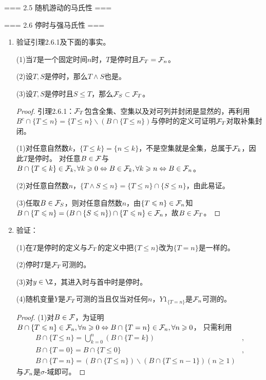 === 2.5 随机游动的马氏性 ===

=== 2.6 停时与强马氏性 ===
\begin{enumerate}
    \item[2.6.1] 验证引理2.6.1及下面的事实。

    (1)当$T$是一个固定时间$n$时，$T$是停时且$\mathcal{F}_T=\mathcal{F}_n$。

    (2)设$T,S$是停时，那么$T\land S$也是。

    (3)设$T,S$是停时且$S\leqslant T$，那么$\mathcal{F}_S\subset\mathcal{F}_T$。
    \begin{proof}
        引理2.6.1：$\mathcal{F}_T$包含全集、空集以及对可列并封闭是显然的，再利用
        $B^c\cap\{T\leqslant n\}=\{T\leqslant n\}\backslash(B\cap\{T\leqslant n\})$与停时的定义可证明$\mathcal{F}_T$对取补集封闭。

        (1)对任意自然数$k$，$\{T\leqslant k\}=\{n\leqslant k\}$，不是空集就是全集，总属于$\mathcal{F}_k$，因此$T$是停时。
        对任意$B\in\mathcal{F}$与$B\cap\{T\leqslant k\}\in\mathcal{F}_k,\forall k\geqslant0\Leftrightarrow B\in\mathcal{F}_k,\forall k\geqslant n\Leftrightarrow B\in\mathcal{F}_n$。

        (2)对任意自然数$n$，$\{T\land S\leqslant n\}=\{T\leqslant n\}\cap\{S\leqslant n\}$，由此易证。

        (3)任取$B\in\mathcal{F}_S$，则对任意自然数$n$，由$\{T\leqslant n\}\in\mathcal{F}_n$知
        $B\cap\{T\leqslant n\}=(B\cap\{S\leqslant n\})\cap\{T\leqslant n\}\in\mathcal{F}_n$，故$B\in\mathcal{F}_T$。
    \end{proof}
    \item[2.6.2] 验证：

    (1)在$T$是停时的定义与$\mathcal{F}_T$的定义中把$\{T\leqslant n\}$改为$\{T=n\}$是一样的。

    (2)停时$T$是$\mathcal{F}_T$可测的。

    (3)对$y\in\Z$，其进入时与首中时是停时。

    (4)随机变量$Y$是$\mathcal{F}_T$可测的当且仅当对任何$n$，$Y1_{\{T=n\}}$是$\mathcal{F}_n$可测的。
    \begin{proof}
        (1)对$B\in\mathcal{F}$，为证明$B\cap\{T\leqslant n\}\in\mathcal{F}_n,\forall n\geqslant0\Leftrightarrow B\cap\{T=n\}\in\mathcal{F}_n,\forall n\geqslant0$，
        只需利用
        \begin{align*}
            B\cap\{T\leqslant n\}=\bigcup_{k=0}^n(B\cap\{T=k\})&,\\
            B\cap\{T=0\}=B\cap\{T\leqslant0\}&,\\
            B\cap\{T=n\}=(B\cap\{T\leqslant n\})\backslash(B\cap\{T\leqslant n-1\})(n\geqslant1)&
        \end{align*}
        与$\mathcal{F}_n$是$\sigma$-域即可。


\end{proof}
\end{enumerate}
